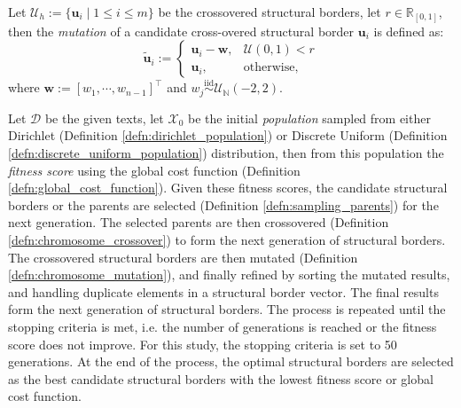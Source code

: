 \begin{defn}\label{defn:chromosome_mutation}
    Let $\mathscr{U}_h:=\{\mathbf{u}_{i}\mid 1\leq i \leq m\}$ be the crossovered structural borders, let $r\in\mathbb{R}_{[0,1]}$, then the \textit{mutation} of a candidate cross-overed structural border $\mathbf{u}_i$ is defined as:
    \begin{equation}
        \tilde{\mathbf{u}}_i:=\begin{cases}
            \mathbf{u}_i-\mathbf{w},&\mathcal{U}(0,1)< r\\
            \mathbf{u}_i,&\text{otherwise},
        \end{cases}
    \end{equation}
    where $\mathbf{w}:=[w_1,\cdots,w_{n-1}]^{\top}$ and $w_j\overset{\text{iid}}{\sim}\mathcal{U}_{\mathbb{N}}(-2,2)$.
\end{defn}

\begin{defn}
    Let $\mathscr{D}$ be the given texts, let $\mathscr{X}_0$ be the initial \textit{population} sampled from either Dirichlet (Definition \ref{defn:dirichlet_population}) or Discrete Uniform (Definition \ref{defn:discrete_uniform_population}) distribution, then from this population the \textit{fitness score} using the global cost function (Definition \ref{defn:global_cost_function}). Given these fitness scores, the candidate structural borders or the parents are selected (Definition \ref{defn:sampling_parents}) for the next generation. The selected parents are then crossovered (Definition \ref{defn:chromosome_crossover}) to form the next generation of structural borders. The crossovered structural borders are then mutated (Definition \ref{defn:chromosome_mutation}), and finally refined by sorting the mutated results, and handling duplicate elements in a structural border vector. The final results form the next generation of structural borders. The process is repeated until the stopping criteria is met, i.e. the number of generations is reached or the fitness score does not improve. For this study, the stopping criteria is set to 50 generations. At the end of the process, the optimal structural borders are selected as the best candidate structural borders with the lowest fitness score or global cost function.
\end{defn}